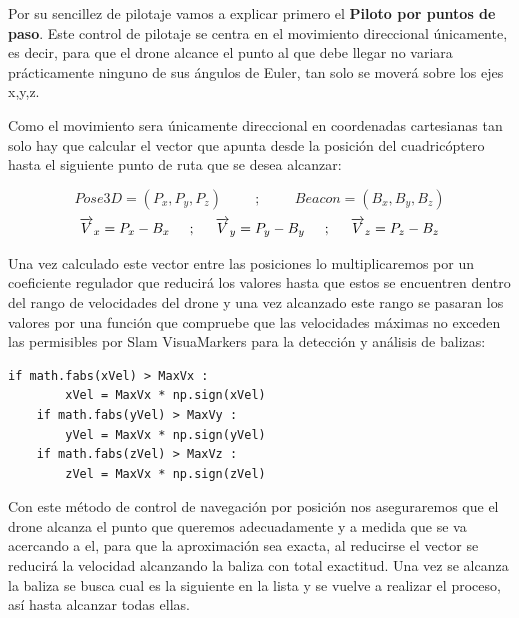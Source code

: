 \hspace{1cm} Por su sencillez de pilotaje vamos a explicar primero el \textbf{Piloto por puntos de paso}. Este control de pilotaje se centra en el movimiento direccional únicamente, es decir, para que el drone alcance el punto al que debe llegar no variara prácticamente ninguno de sus ángulos de Euler, tan solo se moverá sobre los ejes x,y,z.

\hspace{1cm} Como el movimiento sera únicamente direccional en coordenadas cartesianas tan solo hay que calcular el vector que apunta desde la posición del cuadricóptero hasta el siguiente punto de ruta que se desea alcanzar: 

\[Pose3D = (P_{x}, P_{y}, P_{z})\hspace{1cm};\hspace{1cm}Beacon = (B_{x}, B_{y}, B_{z})\]
\[\overrightarrow{V}_{x} = P_{x} - B_{x}\hspace{0.5cm};\hspace{0.5cm}\overrightarrow{V}_{y} = P_{y} - B_{y}\hspace{0.5cm};\hspace{0.5cm}\overrightarrow{V}_{z} = P_{z} - B_{z}\]

\hspace{1cm} Una vez calculado este vector entre las posiciones lo multiplicaremos por un coeficiente regulador que reducirá los valores hasta que estos se encuentren dentro del rango de velocidades del drone y una vez alcanzado este rango se pasaran los valores por una función que compruebe que las velocidades máximas no exceden las permisibles por Slam VisuaMarkers para la detección y análisis de balizas: 

\begin{lstlisting}[backgroundcolor=\color{gray!15}]
    if math.fabs(xVel) > MaxVx :
        xVel = MaxVx * np.sign(xVel)
    if math.fabs(yVel) > MaxVy :
        yVel = MaxVx * np.sign(yVel)
    if math.fabs(zVel) > MaxVz :
        zVel = MaxVx * np.sign(zVel)        
\end{lstlisting}

\hspace{1cm} Con este método de control de navegación por posición nos aseguraremos que el drone alcanza el punto que queremos adecuadamente y a medida que se va acercando a el, para que la aproximación sea exacta, al reducirse el vector se reducirá la velocidad alcanzando la baliza con total exactitud. Una vez se alcanza la baliza se busca cual es la siguiente en la lista y se vuelve a realizar el proceso, así hasta alcanzar todas ellas.

